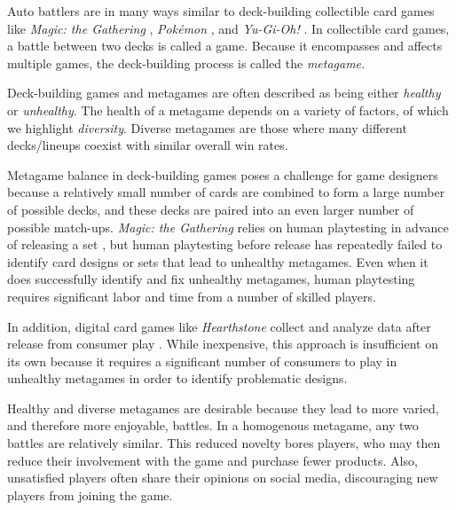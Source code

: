 \documentclass[letterpaper]{article} %
\newcommand{\newterm}[1]{\textit{#1}}
\begin{document}
Auto battlers are in many ways similar to deck-building collectible
card games like \textit{Magic: the Gathering} \cite{magic-the-gathering},
\textit{Pok\'{e}mon} \cite{pokemon-tcg},
and \textit{Yu-Gi-Oh!}
\cite{yugioh-tcg}. In collectible card games, a
battle between two decks is called a game. Because it encompasses and
affects multiple games, the deck-building process is called the
\newterm{metagame.}

Deck-building games and metagames are often described as being either
\newterm{healthy} or \newterm{unhealthy}. The health of a metagame
depends on a variety of factors, of which we highlight
\newterm{diversity}. Diverse metagames are those where many different
decks/lineups coexist with similar overall win rates.

Metagame balance in deck-building games poses a challenge for game
designers because a relatively small number of cards are combined
to form a large number of possible decks, and these decks are paired
into an even larger number of possible match-ups. \textit{Magic: the Gathering}
relies on human playtesting in advance of releasing a set
\cite{designing-hod-ffl}, but human playtesting before release has repeatedly
failed to identify card designs or sets that lead to unhealthy
metagames. Even when it does successfully identify and fix unhealthy
metagames, human playtesting requires significant labor and time from
a number of skilled players.

In addition, digital card games like \textit{Hearthstone} collect and
analyze data after release from consumer play
\cite{blizzard-gamebalancetalk-keg2019}. While inexpensive, this
approach is insufficient on its own because it requires a significant
number of consumers to play in unhealthy metagames in order to
identify problematic designs.


Healthy and diverse metagames are desirable because they lead to more
varied, and therefore more enjoyable, battles. In a homogenous
metagame, any two battles are relatively similar. This reduced novelty
bores players, who may then reduce their involvement with the game and
purchase fewer products. Also, unsatisfied players often share their
opinions on social media, discouraging new players from joining the
game.
\end{document}
